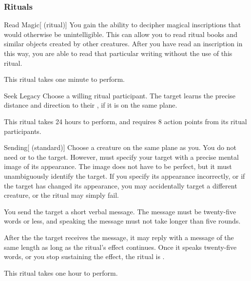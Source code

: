 \subsubsection{Rituals}


\lowercase{\hypertarget{spell:Read Magic}{}}\label{spell:Read Magic}
\begin{attuneability}[\nth{1}]{\hypertarget{spell:Read Magic}{Read Magic}}[ (ritual)]
You gain the ability to decipher magical inscriptions that would otherwise be unintelligible.
This can allow you to read ritual books and similar objects created by other creatures.
After you have read an inscription in this way, you are able to read that particular writing without the use of this ritual.

This ritual takes one minute to perform.
\end{attuneability}
\vspace{0.25em}



\lowercase{\hypertarget{spell:Seek Legacy}{}}\label{spell:Seek Legacy}
\begin{freeability}[\nth{2}]{\hypertarget{spell:Seek Legacy}{Seek Legacy}}
Choose a willing ritual participant.
The target learns the precise distance and direction to their , if it is on the same plane.

This ritual takes 24 hours to perform, and requires 8 action points from its ritual participants.
\end{freeability}
\vspace{0.25em}



\lowercase{\hypertarget{spell:Sending}{}}\label{spell:Sending}
\begin{freeability}[\nth{3}]{\hypertarget{spell:Sending}{Sending}}[ (standard)]
Choose a creature on the same plane as you.
You do not need  or  to the target.
However,  must specify your target with a precise mental image of its appearance.
The image does not have to be perfect, but it must unambiguously identify the target.
If you specify its appearance incorrectly, or if the target has changed its appearance, you may accidentally target a different creature, or the ritual may simply fail.

You send the target a short verbal message.
The message must be twenty-five words or less, and speaking the message must not take longer than five rounds.

After the the target receives the message, it may reply with a message of the same length as long as the ritual's effect continues.
Once it speaks twenty-five words, or you stop sustaining the effect, the ritual is .

This ritual takes one hour to perform.
\end{freeability}
\vspace{0.25em}



